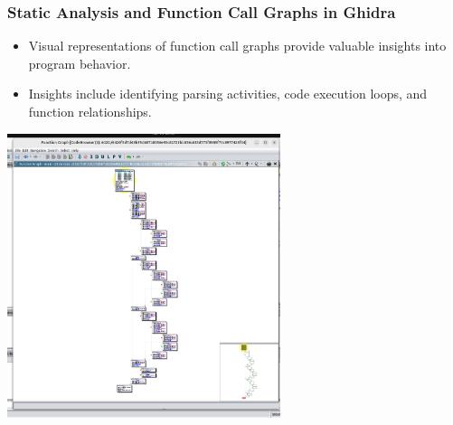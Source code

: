 \begin{frame}
\frametitle{Static Analysis and Function Call Graphs in Ghidra}

\begin{itemize}
    \item Visual representations of function call graphs provide valuable insights into program behavior.
    \item Insights include identifying parsing activities, code execution loops, and function relationships.
\end{itemize}

\centering
\includegraphics[width=0.6\textwidth]{img/gfctg.png}
\end{frame}

